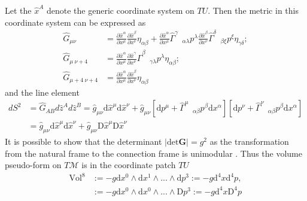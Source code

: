 Let the $\hat{x}^A$ denote the generic coordinate system on $TU$. 
Then the metric in this coordinate system can be expressed as
%
\begin{equation}
\begin{aligned}
\hat{G}_{\mu\nu} &= \frac{\partial \hat{x}^{\alpha}}{\partial x^{\mu}}\frac{\partial \hat{x}^{\beta}}{\partial x^{\nu}}\eta_{\alpha\beta} + \frac{\partial \hat{x}^{\alpha}}{\partial x^{\mu}}{\hat{\Gamma}^{\gamma}}_{\:\:\:\alpha\lambda}p^{\lambda}\frac{\partial \hat{x}^{\beta}}{\partial x^{\nu}}{\hat{\Gamma}^{\delta}}_{\:\:\:\beta\xi}p^{\xi}\eta_{\gamma\delta}; \\
\hat{G}_{\mu\: \nu+4} &= \frac{\partial \hat{x}^{\alpha}}{\partial x^{\mu}}\frac{\partial \hat{x}^{\gamma}}{\partial x^{\nu}}{\hat{\Gamma}^{\beta}}_{\:\:\:\gamma\lambda}p^{\lambda}\eta_{\alpha\beta}; \\
\hat{G}_{\mu+4 \: \nu+4} &= \frac{\partial \hat{x}^{\alpha}}{\partial x^{\mu}}\frac{\partial \hat{x}^{\beta}}{\partial x^{\nu}} \eta_{\alpha\beta}
\end{aligned}
\end{equation}
%
and the line element 
%
\begin{equation}
\begin{aligned}
dS^2 &= \hat{G}_{AB}d\hat{z}^A d\hat{z}^B = \hat{g}_{\mu\nu}\text{d}\hat{x}^{\mu}\text{d}\hat{x}^{\nu} + \hat{g}_{\mu\nu}[\text{d}p^{\mu} + {\hat{\Gamma}^{\mu}}_{\:\:\:\alpha\beta}p^{\beta}\text{d}x^{\alpha}] [\text{d}p^{\nu} + {\hat{\Gamma}^{\nu}}_{\:\:\:\alpha\beta}p^{\beta}\text{d}x^{\alpha}] \\
&= \hat{g}_{\mu\nu}\text{d}\hat{x}^{\mu}\text{d}\hat{x}^{\nu} + \hat{g}_{\mu\nu}\text{D}\hat{x}^{\mu}\text{D}\hat{x}^{\nu}
\end{aligned}
\end{equation}
%
It is possible to show that the determinant $|\text{det}\boldsymbol{G}| = g^{2}$ 
as the transformation from the natural frame to the connection frame is unimodular . 
Thus the volume pseudo-form on $T\mathcal{M}$ is in the coordinate patch $TU$
%
\begin{equation}
\begin{align}
\text{Vol}^8 &:= -g \text{d}x^{0} \wedge \text{d}x^{1} \wedge ... \wedge \text{d}p^{3} := - g\text{d}^{4}x \text{d}^{4}p, \\
&:= -g \text{d}x^{0} \wedge \text{d}x^{0} \wedge ... \wedge \text{D}p^{3} :=-g \text{d}^{4}x\text{D}^4 p
\end{align}
\end{equation}

